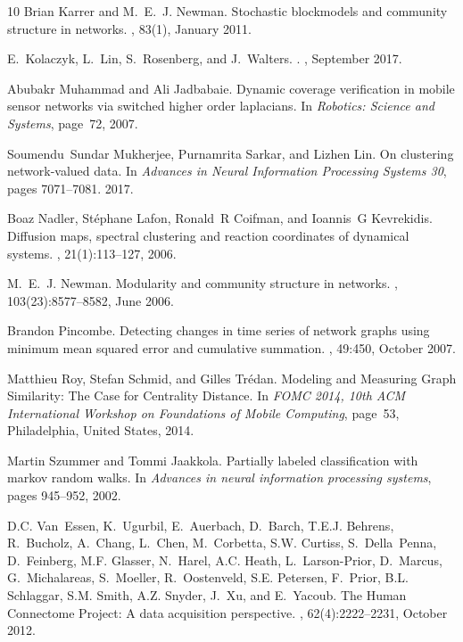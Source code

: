 \documentclass{amsart}
\begin{document}
\begin{thebibliography}{10}
Brian Karrer and M.~E.~J. Newman.
\newblock Stochastic blockmodels and community structure in networks.
, 83(1), January 2011.

E.~{Kolaczyk}, L.~{Lin}, S.~{Rosenberg}, and J.~{Walters}.
.
, September 2017.

Abubakr Muhammad and Ali Jadbabaie.
\newblock Dynamic coverage verification in mobile sensor networks via switched
  higher order laplacians.
\newblock In {\em Robotics: Science and Systems}, page~72, 2007.

Soumendu~Sundar Mukherjee, Purnamrita Sarkar, and Lizhen Lin.
\newblock On clustering network-valued data.
\newblock In {\em Advances in Neural Information Processing Systems 30}, pages
  7071--7081. 2017.

Boaz Nadler, St{\'e}phane Lafon, Ronald~R Coifman, and Ioannis~G Kevrekidis.
\newblock Diffusion maps, spectral clustering and reaction coordinates of
  dynamical systems.
, 21(1):113--127,
  2006.

M.~E.~J. Newman.
\newblock Modularity and community structure in networks.
,
  103(23):8577--8582, June 2006.

Brandon Pincombe.
\newblock Detecting changes in time series of network graphs using minimum mean
  squared error and cumulative summation.
, 49:450, October 2007.

Matthieu Roy, Stefan Schmid, and Gilles Trédan.
\newblock Modeling and {Measuring} {Graph} {Similarity}: {The} {Case} for
  {Centrality} {Distance}.
\newblock In {\em {FOMC} 2014, 10th {ACM} {International} {Workshop} on
  {Foundations} of {Mobile} {Computing}}, page~53, Philadelphia, United States,
  2014.

Martin Szummer and Tommi Jaakkola.
\newblock Partially labeled classification with markov random walks.
\newblock In {\em Advances in neural information processing systems}, pages
  945--952, 2002.

D.C. Van~Essen, K.~Ugurbil, E.~Auerbach, D.~Barch, T.E.J. Behrens, R.~Bucholz,
  A.~Chang, L.~Chen, M.~Corbetta, S.W. Curtiss, S.~Della~Penna, D.~Feinberg,
  M.F. Glasser, N.~Harel, A.C. Heath, L.~Larson-Prior, D.~Marcus,
  G.~Michalareas, S.~Moeller, R.~Oostenveld, S.E. Petersen, F.~Prior, B.L.
  Schlaggar, S.M. Smith, A.Z. Snyder, J.~Xu, and E.~Yacoub.
\newblock The {Human} {Connectome} {Project}: {A} data acquisition perspective.
, 62(4):2222--2231, October 2012.


\end{thebibliography}
\end{document}
